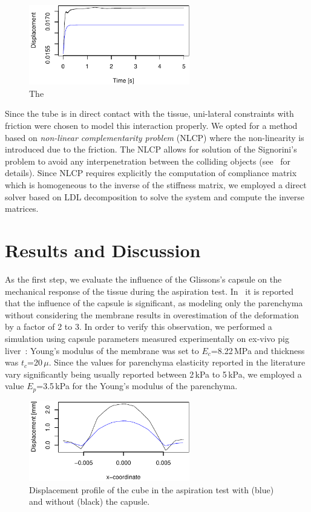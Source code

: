 \documentclass{acm_proc_article-sp}
\begin{document}
\begin{figure}
  \centering
  \includegraphics[height=3.5cm]{displacement.pdf}
  \caption{\label{fig-aspiration1} The }
\end{figure}

Since the tube is in direct contact with the tissue, uni-lateral constraints with friction were chosen 
to model this interaction properly. We opted for a method based on \emph{non-linear complementarity problem}  (NLCP)
where the non-linearity is introduced due to the friction. The NLCP
allows for solution of the Signorini's problem to avoid any interpenetration between the colliding 
objects (see~\cite{Duriez2006b} for details). Since NLCP requires explicitly the computation of compliance matrix which 
is homogeneous to the inverse of the stiffness matrix, we employed a direct solver based on LDL decomposition to 
solve the system and compute the inverse matrices. 


\section{Results and Discussion} %
As the first step, we evaluate the influence of the Glissons's capsule on the mechanical response of the tissue during
the aspiration test. 
In~\cite{Hollenstein2006} it is reported that the influence of the capsule is significant, as modeling 
only the parenchyma without considering the membrane results in overestimation of the deformation by a factor of 2 to 3. 
In order to verify this observation, we performed a simulation using capsule parameters measured experimentally on 
ex-vivo pig liver~\cite{Umale2011}: Young's modulus of the membrane was set to $E_c$=8.22\,MPa and thickness was
$t_c$=20\,$\mu$. 
Since the values for parenchyma elasticity reported in the literature vary significantly being usually reported between 2\,kPa to 5\,kPa, 
we employed a value $E_p$=3.5\,kPa for the Young's modulus of the parenchyma. 

\begin{figure}
  \centering
  \includegraphics[width=7cm]{aspiration.pdf}
  \caption{\label{fig-aspiration2} Displacement profile of the cube in the
  aspiration test with (blue) and without (black) the capusle.}
\end{figure}
\end{document}
